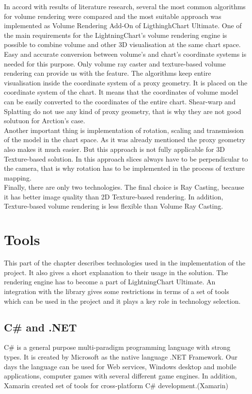 \documentclass[twoside, english, 11pt]{report}
\begin{document}
In accord with results of literature research, several the most common algorithms for volume rendering were compared and the most suitable approach was implemented as Volume Rendering Add-On of LigthinghChart Ultimate. One of the main requirements for the LightningChart's volume rendering engine is possible to combine volume and other 3D visualisation at the same chart space. Easy and accurate conversion between volume's and chart's coordinate systems is needed for this  purpose. Only volume ray caster and texture-based volume rendering can provide us with the feature. The algorithms keep entire visualisation inside the coordinate system of a proxy geometry. It is placed on the coordinate system of the chart. It means that the coordinates of volume model can be easily converted to the coordinates of the entire chart. Shear-warp and Splatting do not use any kind of proxy geometry, that is why they are not good solutuon for Arction's case.\\

Another important thing is implementation of rotation, scaling and transmission of the model in the chart space. As it was already mentioned the proxy geometry also makes it much easier. But this approach is not fully applicable for 3D Texture-based solution. In this approach slices always have to be perpendicular to the camera, that is why rotation has to be implemented in the process of texture mapping.\\

Finally, there are only two technologies. The final choice is Ray Casting, because it has better image quality than 2D Texture-based rendering. In addition, Texture-based volume rendering is less flexible than Volume Ray Casting.
\section{Tools}
This part of the chapter describes technologies used in the implementation of the project. It also gives a short explanation to their usage in the solution. The rendering engine has to become a part of LightningChart Ultimate. An integration with the library gives some restrictions in terms of a set of tools which can be used in the project and it plays a key role in technology selection.
\subsection{C\# and .NET}
C\# is a general purpose multi-paradigm programming language with strong types. It is created by Microsoft as the native language .NET Framework. Our days the language can be used for Web services, Windows desktop and mobile applications, computer games with several different game engines. In addition, Xamarin created set of tools for cross-platform C\# development.(Xamarin)\\
\end{document}
